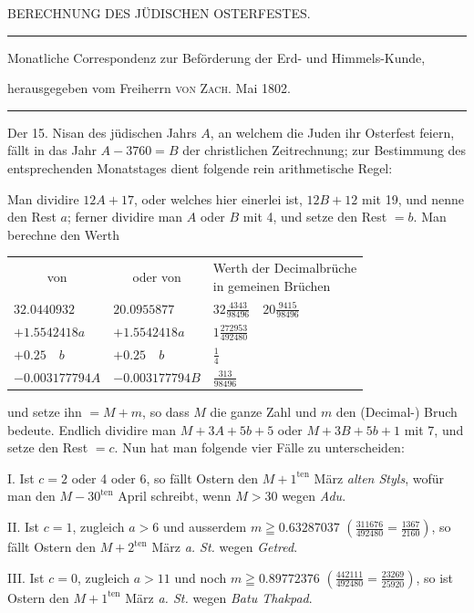 \clearpage{}%
\begin{center}
{\large BERECHNUNG DES JÜDISCHEN OSTERFESTES.\par}
\medskip\hrule\medskip
{\small Monatliche Correspondenz zur Beförderung der Erd- und Himmels-Kunde,\par
herausgegeben vom Freiherrn \textsc{von Zach}. Mai 1802.\par}
\medskip\hrule
\end{center}\medskip
Der 15. Nisan des jüdischen Jahrs $A$, an welchem die Juden ihr Osterfest
feiern, fällt in das Jahr $A-3760=B$ der christlichen Zeitrechnung; zur Bestimmung
des entsprechenden Monatstages dient folgende rein arithmetische
Regel:

Man dividire $12A+17$, oder welches hier einerlei ist, $12B+12$ mit 19,
und nenne den Rest $a$; ferner dividire man $A$ oder $B$ mit 4, und setze den
Rest $=b$. Man berechne den Werth
\begin{center}\small
\begin{tabular}{lll}
\multicolumn{1}{c}{von} & \multicolumn{1}{c}{oder von} & \shortstack{Werth der Decimalbrüche\\in gemeinen Brüchen}\\[5pt]
$32.0440932$ & $20.0955877$ & $32\frac{4343}{98496}\quad20\frac{9415}{98496}$\\[5pt]
$+1.5542418a$ & $+1.5542418a$ & $1\frac{272953}{492480}$\\[5pt]
$+0.25\quad b$ & $+0.25\quad b$ & $\frac14$\\[5pt]
$-0.003177794A$ & $-0.003177794B$ & $\frac{313}{98496}$
\end{tabular}
\end{center}
und setze ihn $=M+m$, so dass $M$ die ganze Zahl und $m$ den (Decimal-)
Bruch bedeute. Endlich dividire man $M+3A+5b+5$ oder $M+3B+5b+1$
mit 7, und setze den Rest $=c$. Nun hat man folgende vier Fälle zu unterscheiden:

I. Ist $c=2$ oder 4 oder 6, so fällt Ostern den $M+1^{\mathrm{ten}}$ März \textit{alten Styls},
wofür man den $M-30^{\mathrm{ten}}$ April schreibt, wenn $M>30$ wegen \textit{Adu}.
%

II. Ist $c=1$, zugleich $a>6$ und ausserdem $m\geqq0.63287037$
$(\frac{311676}{492480}=\frac{1367}{2160})$,
so fällt Ostern den $M+2^{\mathrm{ten}}$ März \textit{a. St.} wegen \textit{Getred}.

III. Ist $c=0$, zugleich $a>11$ und noch $m\geqq0.89772376$
$(\frac{442111}{492480}=\frac{23269}{25920})$,
so ist Ostern den $M+1^{\mathrm{ten}}$ März \textit{a. St.} wegen \textit{Batu Thakpad}.

